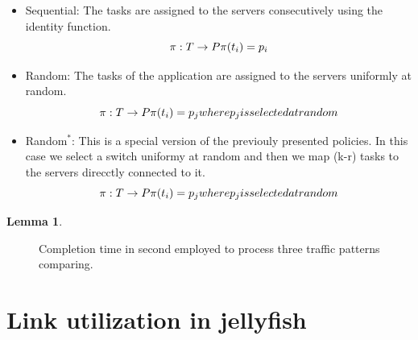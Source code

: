 \documentclass{sig-alternate}
\newtheorem{lemma}{Lemma}
\begin{document}
\begin{itemize}
    \item Sequential: The tasks are assigned to the servers consecutively using the identity function.
        \begin{equation}
            \pi:T \rightarrow P\\
            \pi(t_i)=p_i
        \end{equation}
    \item Random: The tasks of the application are assigned to the servers uniformly at random.
        \begin{equation}
            \pi:T \rightarrow P\\
            \pi(t_i)=p_j where p_j is selected at random
        \end{equation}
    \item Random$^*$: This is a special version of the previouly presented policies. In this case we select a switch uniformy at random and then we map (k-r) tasks to the servers direcctly connected to it. 
        \begin{equation}
            \pi:T \rightarrow P\\
            \pi(t_i)=p_j where p_j is selected at random
        \end{equation}
\end{itemize}

\begin{lemma}

\end{lemma}



\begin{figure}[t]
  \begin{tikzpicture}
         
  \end{tikzpicture}
  \caption{Completion time in second employed to process three traffic patterns comparing.}
\label{fig:plot-dynamic}
\end{figure}


\section{Link utilization in jellyfish}
\label{linkutilization}
\end{document}
